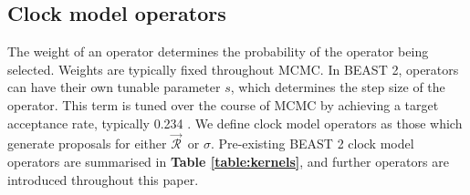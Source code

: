 \documentclass[10pt,letterpaper]{article}
\begin{document}
\subsection*{Clock model operators}
\label{sect:clockModelOperators}

The weight of an operator determines the probability of the operator being selected.
Weights are typically fixed throughout MCMC.
In BEAST 2, operators can have their own tunable parameter $s$, which determines the step size of the operator.
This term is tuned over the course of MCMC by achieving a target acceptance rate, typically 0.234 \cite{roberts1997weak, rosenthal2011optimal, bouckaert2019beast}.
We define clock model operators as those which generate proposals for either $\vec{\mathcal{R}}^{\,}$ or $\sigma$.
Pre-existing BEAST 2 clock model operators are summarised in \textbf{Table \ref{table:kernels}}, and further operators are introduced throughout this paper.
\end{document}
